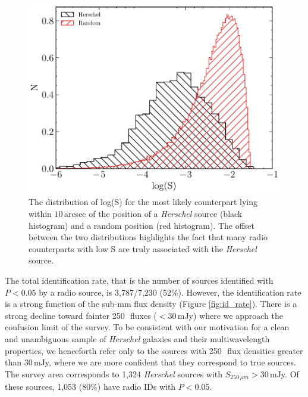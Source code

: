 \begin{figure}
	\centering
	\includegraphics[width=0.75\columnwidth]{Figures/ds_distributions.pdf}
	\caption{The distribution of log(S) for the most likely counterpart lying within $10\,$arcsec of the position of a \textit{Herschel} source (black histogram) and a random position (red histogram). The offset between the two distributions highlights the fact that many radio counterparts with low S are truly associated with the \textit{Herschel} source.}
	\label{fig:ds_distributions}
\end{figure}

The total identification rate, that is the number of sources identified with $P < 0.05$ by a radio source, is 3,787/7,230 (52\%). However, the identification rate is a strong function of the sub-mm flux density (Figure \ref{fig:id_rate}). There is a strong decline toward fainter 250\,\micron\ fluxes ($< 30\,$mJy) where we approach the confusion limit of the survey. To be consistent with our motivation for a clean and unambiguous sample of \textit{Herschel} galaxies and their multiwavelength properties, we henceforth refer only to the sources with 250\,\micron\ flux densities greater than 30\,mJy, where we are more confident that they correspond to true sources. The survey area corresponds to 1,324 \textit{Herschel} sources with $S_{250\,\mu m} > 30\,$mJy. Of these sources, 1,053 (80\%) have radio IDs with $P < 0.05$.

